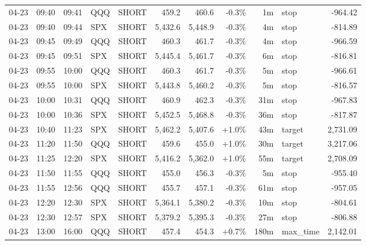 \documentclass[11pt,a4paper,twoside]{article}
\begin{document}
\begin{center}
\begin{longtable}{>{\color{txtmain}}l l l l l r r r r >{\color{txtmain}}l r}
04-23 & 09:40 & 09:41 & QQQ & SHORT & 459.2 & 460.6 & \textcolor{lossred}{-0.3\%} & 1m & stop & \textcolor{lossred}{-964.42} \\
04-23 & 09:40 & 09:44 & SPX & SHORT & 5,432.6 & 5,448.9 & \textcolor{lossred}{-0.3\%} & 4m & stop & \textcolor{lossred}{-814.89} \\
04-23 & 09:45 & 09:49 & QQQ & SHORT & 460.3 & 461.7 & \textcolor{lossred}{-0.3\%} & 4m & stop & \textcolor{lossred}{-966.59} \\
04-23 & 09:45 & 09:51 & SPX & SHORT & 5,445.4 & 5,461.7 & \textcolor{lossred}{-0.3\%} & 6m & stop & \textcolor{lossred}{-816.81} \\
04-23 & 09:55 & 10:00 & QQQ & SHORT & 460.3 & 461.7 & \textcolor{lossred}{-0.3\%} & 5m & stop & \textcolor{lossred}{-966.61} \\
04-23 & 09:55 & 10:00 & SPX & SHORT & 5,443.8 & 5,460.2 & \textcolor{lossred}{-0.3\%} & 5m & stop & \textcolor{lossred}{-816.57} \\
04-23 & 10:00 & 10:31 & QQQ & SHORT & 460.9 & 462.3 & \textcolor{lossred}{-0.3\%} & 31m & stop & \textcolor{lossred}{-967.83} \\
04-23 & 10:00 & 10:36 & SPX & SHORT & 5,452.5 & 5,468.8 & \textcolor{lossred}{-0.3\%} & 36m & stop & \textcolor{lossred}{-817.87} \\
04-23 & 10:40 & 11:23 & SPX & SHORT & 5,462.2 & 5,407.6 & \textcolor{wingreen}{+1.0\%} & 43m & target & \textcolor{wingreen}{2,731.09} \\
04-23 & 11:20 & 11:50 & QQQ & SHORT & 459.6 & 455.0 & \textcolor{wingreen}{+1.0\%} & 30m & target & \textcolor{wingreen}{3,217.06} \\
04-23 & 11:25 & 12:20 & SPX & SHORT & 5,416.2 & 5,362.0 & \textcolor{wingreen}{+1.0\%} & 55m & target & \textcolor{wingreen}{2,708.09} \\
04-23 & 11:50 & 11:55 & QQQ & SHORT & 455.0 & 456.3 & \textcolor{lossred}{-0.3\%} & 5m & stop & \textcolor{lossred}{-955.40} \\
04-23 & 11:55 & 12:56 & QQQ & SHORT & 455.7 & 457.1 & \textcolor{lossred}{-0.3\%} & 61m & stop & \textcolor{lossred}{-957.05} \\
04-23 & 12:20 & 12:30 & SPX & SHORT & 5,364.1 & 5,380.2 & \textcolor{lossred}{-0.3\%} & 10m & stop & \textcolor{lossred}{-804.61} \\
04-23 & 12:30 & 12:57 & SPX & SHORT & 5,379.2 & 5,395.3 & \textcolor{lossred}{-0.3\%} & 27m & stop & \textcolor{lossred}{-806.88} \\
04-23 & 13:00 & 16:00 & QQQ & SHORT & 457.4 & 454.3 & \textcolor{wingreen}{+0.7\%} & 180m & max\_time & \textcolor{wingreen}{2,142.01} \\

\end{longtable}
\end{center}
\end{document}
